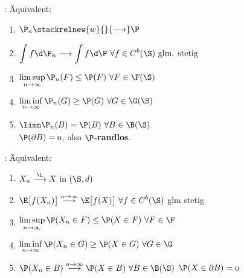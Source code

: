 \begin{minipage}{0.49\textwidth}
	: Äquivalent:
		\begin{enumerate}[label=(\arabic*)]
		\item $\begin{aligned}
			\P_n\stackrelnew{w}{}{\longrightarrow} \P
		\end{aligned}$
		\item $\begin{aligned}
			\int\limits f\d \P_n\stackrel{}{\longrightarrow}\int\limits f\d \P~\forall f\in C^b(\S)\text{ glm. stetig}
		\end{aligned}$
		\item $\begin{aligned}
			\limsup\limits_{n\to\infty} \P_n(F)\leq \P(F)~\forall F\in\F(\S)
		\end{aligned}$
		\item $\begin{aligned}
			\liminf\limits_{n\to\infty} \P_n(G)\geq \P(G)~\forall G\in\G(\S)
		\end{aligned}$
		\item $\begin{aligned}
			\limn \P_n(B)=\P(B)~\forall B\in\B(\S)
		\end{aligned}$\\ $\mit \P(\partial B)=0$, also \textbf{$\P$-randlos}.
	\end{enumerate}
\end{minipage}
\begin{minipage}{0.49\textwidth}
	: Äquivalent:
		\begin{enumerate}[label=(\arabic*)]
		\item $\begin{aligned}
			X_n\stackrel{\L}{\longrightarrow} X\text{ in }(\S,d)
		\end{aligned}$
		\item $\begin{aligned}
			\E\big[f(X_n)\big]\stackrel{n\to\infty}{\longrightarrow}\E\big[f(X)\big]~\forall f\in C^b(\S)
		\end{aligned}$ glm stetig
		\item $\begin{aligned}
			\limsup\limits_{n\to\infty}\P(X_n\in F)\leq\P(X\in F)~\forall F\in\F
		\end{aligned}$
		\item $\begin{aligned}
			\liminf\limits_{n\to\infty}\P(X_n\in G)\geq\P(X\in G)~\forall G\in\G
		\end{aligned}$
		\item $\begin{aligned}
			\P(X_n\in B)\stackrel{n\to\infty}{\longrightarrow}\P(X\in B)~\forall B\in\B(\S)
		\end{aligned}$ $\mit\P(X\in\partial B)=0$
	\end{enumerate}
\end{minipage}

